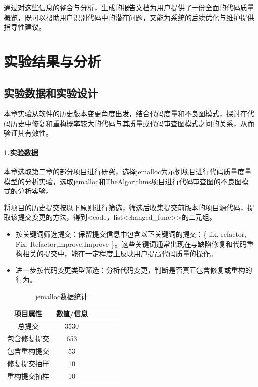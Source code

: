 通过对这些信息的整合与分析，生成的报告文档为用户提供了一份全面的代码质量概览，既可以帮助用户识别代码中的潜在问题，又能为系统的后续优化与维护提供指导性建议。

\section{实验结果与分析}

\subsection{实验数据和实验设计}

本章实验从软件的历史版本变更角度出发，结合代码度量和不良图模式，探讨在代码历史中修复和重构概率较大的代码与其质量或代码审查图模式之间的关系，从而验证其有效性。

\paragraph{1.实验数据} 本章选取第二章的部分项目进行研究，选择jemalloc为示例项目进行代码质量度量模型的分析实验，选取jemalloc和TheAlgorithms项目进行代码审查图的不良图模式的分析实验。

将项目的历史提交按以下原则进行筛选，筛选后收集提交前版本的项目源代码，提取该提交变更的方法，得到<code，list<changed\_func>>的二元组。

\begin{itemize}
    \item 按关键词筛选提交：保留提交信息中包含以下关键词的提交：\{ fix, refactor, Fix, Refactor,improve,Improve \}。这些关键词通常出现在与缺陷修复和代码重构相关的提交中，能在一定程度上反映用户提高代码质量的操作。
    \item 进一步按代码变更类型筛选：分析代码变更，判断是否真正包含修复或重构的行为。
\end{itemize}

\begin{table}[htbp]
\caption{jemalloc数据统计}
\vspace{0.5em}\centering\wuhao
\begin{tabular}{cccccc}
\toprule
项目属性 & 数值/信息 \\
\midrule
总提交 & 3530 \\
包含修复提交 & 653  \\
包含重构提交 & 53  \\
修复提交抽样 & 10 \\
重构提交抽样 &  10 \\
\bottomrule
\end{tabular}
\end{table}

